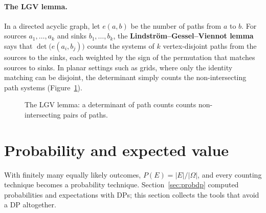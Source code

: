 \paragraph{The LGV lemma.} In a directed acyclic graph, let $e(a, b)$ be the number of paths from $a$ to $b$. For sources $a_1, \dots,
a_k$ and sinks $b_1, \dots, b_k$, the \textbf{Lindstr\"om--Gessel--Viennot lemma} says that $\det\bigl(e(a_i, b_j)\bigr)$ counts the
systems of $k$ vertex-disjoint paths from the sources to the sinks, each weighted by the sign of the permutation that matches sources to
sinks. In planar settings such as grids, where only the identity matching can be disjoint, the determinant simply counts the
non-intersecting path systems (Figure~\ref{fig:lgv}).

\begin{figure}[htbp]
\centering
{}
\caption{The LGV lemma: a determinant of path counts counts non-intersecting pairs of paths.}
\label{fig:lgv}
\end{figure}

\section[Probability and expected value]{Probability and expected value \hfill \gold}\label{sec:probability}

With finitely many equally likely outcomes, $P(E) = |E| / |\Omega|$, and every counting technique becomes a probability technique.
Section~\ref{sec:probdp} computed probabilities and expectations with DPs; this section collects the tools that avoid a DP altogether.

